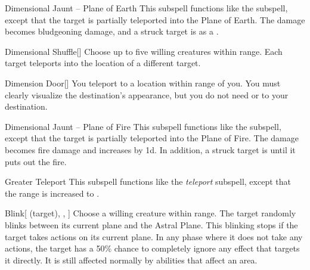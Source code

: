 \begin{ability}[\nth{2}]{Dimensional Jaunt -- Plane of Earth}
This subspell functions like the  subspell, except that the target is partially teleported into the Plane of Earth.
The damage becomes bludgeoning damage, and a struck target is  as a .
\end{ability}
\vspace{0.25em}


\begin{ability}[\nth{2}]{Dimensional Shuffle}[]
Choose up to five willing creatures within \rngmed range.
Each target teleports into the location of a different target.
\end{ability}
\vspace{0.25em}


\begin{ability}[\nth{3}]{Dimension Door}[]
You teleport to a location within \rngext range of you.
You must clearly visualize the destination's appearance, but you do not need  or  to your destination.
\end{ability}
\vspace{0.25em}


\begin{ability}[\nth{3}]{Dimensional Jaunt -- Plane of Fire}
This subspell functions like the  subspell, except that the target is partially teleported into the Plane of Fire.
The damage becomes fire damage and increases by \plus1d.
In addition, a struck target is  until it puts out the fire.
\end{ability}
\vspace{0.25em}


\begin{ability}[\nth{3}]{Greater Teleport}
This subspell functions like the \textit{teleport} subspell, except that the range is increased to \rngext.
\end{ability}
\vspace{0.25em}


\begin{ability}[\nth{4}]{Blink}[ (target), , ]
Choose a willing creature within \rngclose range.
The target randomly blinks between its current plane and the Astral Plane.
This blinking stops if the target takes actions on its current plane.
In any phase where it does not take any actions, the target has a 50\% chance to completely ignore any effect that targets it directly.
It is still affected normally by abilities that affect an area.
\end{ability}
\vspace{0.25em}


